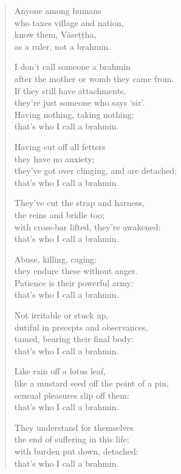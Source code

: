 \documentclass[12pt,openany]{book}%
\begin{document}
\begin{verse}
Anyone among humans \\
who taxes village and nation, \\
know them, \textsanskrit{Vāseṭṭha}, \\
as a ruler, not a brahmin. 

I don’t call someone a brahmin \\
after the mother or womb they came from. \\
If they still have attachments, \\
they’re just someone who says ‘sir’. \\
Having nothing, taking nothing: \\
that’s who I call a brahmin. 

Having cut off all fetters \\
they have no anxiety; \\
they’ve got over clinging, and are detached: \\
that’s who I call a brahmin. 

They’ve cut the strap and harness, \\
the reins and bridle too; \\
with cross-bar lifted, they’re awakened: \\
that’s who I call a brahmin. 

Abuse, killing, caging: \\
they endure these without anger. \\
Patience is their powerful army: \\
that’s who I call a brahmin. 

Not irritable or stuck up, \\
dutiful in precepts and observances, \\
tamed, bearing their final body: \\
that’s who I call a brahmin. 

Like rain off a lotus leaf, \\
like a mustard seed off the point of a pin, \\
sensual pleasures slip off them: \\
that’s who I call a brahmin. 

They understand for themselves \\
the end of suffering in this life; \\
with burden put down, detached: \\
that’s who I call a brahmin. 


\end{verse}
\end{document}
